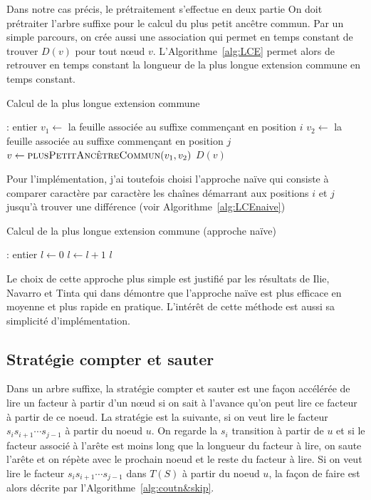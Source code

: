 \documentclass[10pt,letterpaper,oneside]{article}
\begin{document}
Dans notre cas précis, le prétraitement s'effectue en deux partie On doit prétraiter l'arbre suffixe pour le calcul du plus petit ancêtre commun. Par un simple parcours, on crée aussi une association qui permet en temps constant de trouver $D(v)$ pour tout nœud $v$. L'Algorithme~\ref{alg:LCE} permet alors de retrouver en temps constant la longueur de la plus longue extension commune en temps constant.

\begin{algorithm}[htb]
    \caption{Calcul de la plus longue extension commune}
    \label{alg:LCE}
    \begin{algorithmic}[1]
        : entier
            \State $v_1\gets $ la feuille associée au suffixe commençant en position $i$
            \State $v_2\gets $ la feuille associée au suffixe commençant en position $j$
            \State $v\gets  \Call{plusPetitAncêtreCommun}{v_1,v_2}$
            \State \Return $D(v)$
        \EndFunction
    \end{algorithmic}
\end{algorithm}

Pour l'implémentation, j'ai toutefois choisi l'approche naïve qui consiste à comparer caractère par caractère les chaînes démarrant aux positions $i$ et $j$  jusqu'à trouver une différence (voir Algorithme~\ref{alg:LCEnaive})

\begin{algorithm}[htb]
    \caption{Calcul de la plus longue extension commune (approche naïve)}
    \label{alg:LCEnaive}
    \begin{algorithmic}[1]
        : entier
            \State $l\gets 0$
                \State $l\gets l+1$
            \EndWhile
            \Return $l$
        \EndFunction
    \end{algorithmic}
\end{algorithm}

Le choix de cette approche plus simple est justifié par les résultats de Ilie, Navarro et Tinta qui dans \cite{MR2735498} démontre que l'approche naïve est plus efficace en moyenne et plus rapide en pratique. L'intérêt de cette méthode est aussi sa simplicité d'implémentation.

\subsection{Stratégie compter et sauter} \label{sec:count&skip}
Dans un arbre suffixe, la stratégie compter et sauter est une façon accélérée de lire un facteur à partir d'un nœud si on sait à l'avance qu'on peut lire ce facteur à partir de ce noeud. La stratégie est la suivante, si on veut lire le facteur $s_is_{i+1}\cdots s_{j-1}$ à partir du noeud $u$. On regarde la $s_i$ transition à partir de $u$ et si le facteur associé à l'arête est moins long que la longueur du facteur à lire, on saute l'arête et on répète avec le prochain noeud et le reste du facteur à lire. Si on veut lire le facteur $s_is_{i+1}\cdots s_{j-1}$ dans $T(S)$ à partir du noeud $u$, la façon de faire est alors décrite par l'Algorithme~\ref{alg:coutn&skip}.
\end{document}
